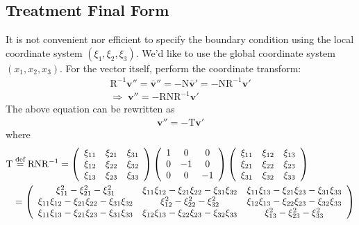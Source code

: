 \documentclass[a4paper,12pt,dvips]{article}
\newcommand*\defeq{\buildrel{\text{def}}\over{=}}
\begin{document}
\subsection{Treatment Final Form}

It is not convenient nor efficient to specify the boundary condition using the
local coordinate system $(\xi_1, \xi_2, \xi_3)$.  We'd like to use the global
coordinate system $(x_1, x_2, x_3)$.  For the vector itself, perform the
coordinate transform:
\begin{gather*}
  \mathrm{R}^{-1}\mathbf{v}''
  = \bar{\mathbf{v}}''
  = -\mathrm{N}\bar{\mathbf{v}}'
  = -\mathrm{N}\mathrm{R}^{-1}\mathbf{v}'
  \\
  \Rightarrow \;
  \mathbf{v}'' = -\mathrm{RNR^{-1}}\mathbf{v}'
\end{gather*}
The above equation can be rewritten as
\begin{align*}
  \mathbf{v}'' = -\mathrm{T}\mathbf{v}'
\end{align*}
where
\begin{align*}
  \mathrm{T}
 &\defeq \mathrm{RNR^{-1}}
  = \left(\begin{array}{ccc}
    \xi_{11} & \xi_{21} & \xi_{31} \\
    \xi_{12} & \xi_{22} & \xi_{32} \\
    \xi_{13} & \xi_{23} & \xi_{33}
  \end{array}\right)
  \left(\begin{array}{ccc}
    1 & 0 & 0 \\
    0 & -1 & 0 \\
    0 & 0 & -1
  \end{array}\right)
  \left(\begin{array}{ccc}
    \xi_{11} & \xi_{12} & \xi_{13} \\
    \xi_{21} & \xi_{22} & \xi_{23} \\
    \xi_{31} & \xi_{32} & \xi_{33}
  \end{array}\right)
  \\
 &= \left(\begin{array}{ccc}
    \xi_{11}^2       - \xi_{21}^2       - \xi_{31}^2       &
    \xi_{11}\xi_{12} - \xi_{21}\xi_{22} - \xi_{31}\xi_{32} &
    \xi_{11}\xi_{13} - \xi_{21}\xi_{23} - \xi_{31}\xi_{33} \\
    \xi_{11}\xi_{12} - \xi_{21}\xi_{22} - \xi_{31}\xi_{32} &
    \xi_{12}^2       - \xi_{22}^2       - \xi_{32}^2       &
    \xi_{12}\xi_{13} - \xi_{22}\xi_{23} - \xi_{32}\xi_{33} \\
    \xi_{11}\xi_{13} - \xi_{21}\xi_{23} - \xi_{31}\xi_{33} &
    \xi_{12}\xi_{13} - \xi_{22}\xi_{23} - \xi_{32}\xi_{33} &
    \xi_{13}^2       - \xi_{23}^2       - \xi_{33}^2
  \end{array}\right)
\end{align*}
\end{document}
